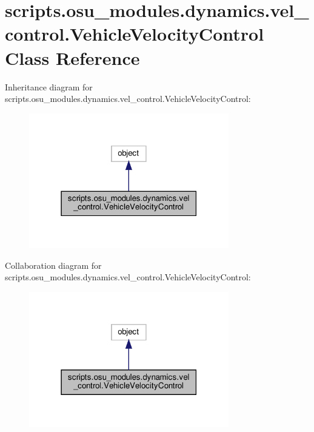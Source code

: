\hypertarget{classscripts_1_1osu__modules_1_1dynamics_1_1vel__control_1_1VehicleVelocityControl}{}\section{scripts.\+osu\+\_\+modules.\+dynamics.\+vel\+\_\+control.\+Vehicle\+Velocity\+Control Class Reference}
\label{classscripts_1_1osu__modules_1_1dynamics_1_1vel__control_1_1VehicleVelocityControl}


Inheritance diagram for scripts.\+osu\+\_\+modules.\+dynamics.\+vel\+\_\+control.\+Vehicle\+Velocity\+Control\+:
\nopagebreak
\begin{figure}[H]
\begin{center}
\leavevmode
\includegraphics[width=247pt]{d1/d10/classscripts_1_1osu__modules_1_1dynamics_1_1vel__control_1_1VehicleVelocityControl__inherit__graph}
\end{center}
\end{figure}


Collaboration diagram for scripts.\+osu\+\_\+modules.\+dynamics.\+vel\+\_\+control.\+Vehicle\+Velocity\+Control\+:
\nopagebreak
\begin{figure}[H]
\begin{center}
\leavevmode
\includegraphics[width=247pt]{df/de5/classscripts_1_1osu__modules_1_1dynamics_1_1vel__control_1_1VehicleVelocityControl__coll__graph}
\end{center}
\end{figure}
